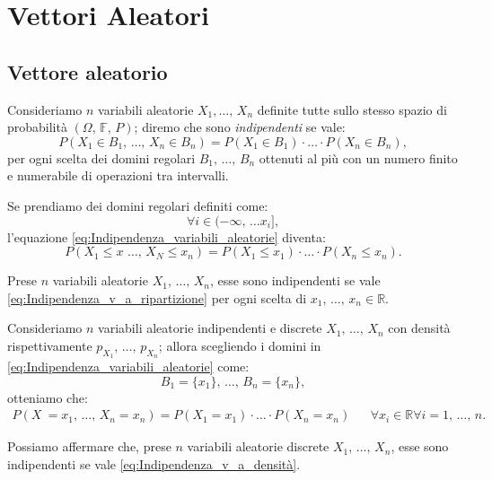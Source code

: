 
\chapter{Vettori Aleatori}
    \section{Vettore aleatorio}
        \begin{defn}
            Consideriamo $n$ variabili aleatorie $X_1, \ldots,\, X_n$ definite tutte sullo stesso spazio di probabilità $(\Omega,\,\mathbb{F},\,P)$; diremo che sono  \textit{indipendenti} se vale:
            \begin{equation}\label{eq:Indipendenza_variabili_aleatorie}
                P(X_1 \in B_1,\, \ldots,\, X_n \in B_n) = P(X_1 \in B_1) \cdot \ldots \cdot P(X_n \in B_n)
            ,\end{equation}
            per ogni scelta dei domini regolari $B_1,\, \ldots,\, B_n$ ottenuti al più con un numero finito e numerabile di operazioni tra intervalli.
        \end{defn}
        \begin{obsv}
            Se prendiamo dei domini regolari definiti come: \[
                \forall i \in (-\infty,\, \ldots x_i]
            ,\] l'equazione \eqref{eq:Indipendenza_variabili_aleatorie} diventa:
            \begin{equation}\label{eq:Indipendenza_v_a_ripartizione}
                P(X_1 \leq x\,\, \ldots,\, X_N \leq x_n) = P(X_1 \leq x_1) \cdot \ldots \cdot P(X_n \leq x_n)
            .\end{equation}
        \end{obsv}
        \begin{prty}
            Prese $n$ variabili aleatorie $X_1,\, \ldots,\, X_n$, esse sono indipendenti se vale  \eqref{eq:Indipendenza_v_a_ripartizione} per ogni scelta di $x_1,\, \ldots,\, x_n \in \mathbb{R}$.
        \end{prty}
        \begin{obsv}
            Consideriamo $n$ variabili aleatorie indipendenti e discrete $X_1,\, \ldots,\, X_n$ con densità rispettivamente $p_{X_1},\, \ldots,\, p_{X_n}$; allora scegliendo i domini in \eqref{eq:Indipendenza_variabili_aleatorie} come: \[
                B_1 = \{x_1\},\, \ldots,\, B_n = \{x_n\}
            ,\] otteniamo che:
            \begin{align}\label{eq:Indipendenza_v_a_densità}
                P(X\ = x_1,\, \ldots,\, X_n = x_n) = P(X_1 = x_1) \cdot \ldots \cdot P(X_n = x_n) & &
                \forall  x_i \in \mathbb{R} \forall i = 1,\, \ldots,\, n
            .\end{align}
        \end{obsv}
        \begin{prty}
            Possiamo affermare che, prese $n$ variabili aleatorie discrete $X_1,\, \ldots,\, X_n$, esse sono indipendenti se vale \eqref{eq:Indipendenza_v_a_densità}.
        \end{prty}
